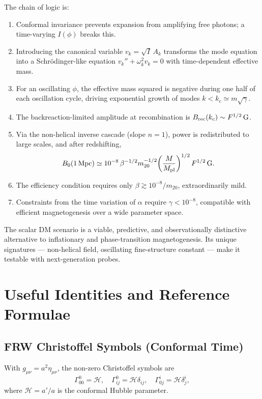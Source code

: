 \documentclass[12pt,a4paper,openany]{book}
\newcommand{\Ak}{A_k}
\newcommand{\vk}{v_k}
\newcommand{\Mpl}{M_{\rm pl}}
\newcommand{\kc}{k_c}
\begin{document}
The chain of logic is:
\begin{enumerate}
  \item Conformal invariance prevents expansion from amplifying free photons; a time-varying $I(\phi)$ breaks this.
  \item Introducing the canonical variable $\vk = \sqrt{I}\,\Ak$ transforms the mode equation into a Schr\"{o}dinger-like equation $\vk'' + \omega_k^2\vk = 0$ with time-dependent effective mass.
  \item For an oscillating $\phi$, the effective mass squared is negative during one half of each oscillation cycle, driving exponential growth of modes $k < \kc \simeq m\sqrt{\gamma}$.
  \item The backreaction-limited amplitude at recombination is $B_{\rm rec}(\kc) \sim F^{1/2}\,\mathrm{G}$.
  \item Via the non-helical inverse cascade (slope $n=1$), power is redistributed to large scales, and after redshifting,
  \[
    B_0(1\,\mathrm{Mpc}) \simeq 10^{-8}\,\beta^{-1/2}m_{20}^{-1/2}\!\left(\frac{M}{\Mpl}\right)^{1/2}F^{1/2}\,\mathrm{G}.
  \]
  \item The efficiency condition requires only $\beta \gtrsim 10^{-8}/m_{20}$, extraordinarily mild.
  \item Constraints from the time variation of $\alpha$ require $\gamma < 10^{-8}$, compatible with efficient magnetogenesis over a wide parameter space.
\end{enumerate}

The scalar DM scenario is a viable, predictive, and observationally distinctive alternative to inflationary and phase-transition magnetogenesis. Its unique signatures — non-helical field, oscillating fine-structure constant — make it testable with next-generation probes.

\appendix
\chapter{Useful Identities and Reference Formulae}

\section{FRW Christoffel Symbols (Conformal Time)}

With $g_{\mu\nu} = a^2\eta_{\mu\nu}$, the non-zero Christoffel symbols are
\begin{equation}
  \Gamma^0_{00} = \mathcal{H}, \quad \Gamma^0_{ij} = \mathcal{H}\delta_{ij}, \quad \Gamma^i_{0j} = \mathcal{H}\delta^i_j,
\end{equation}
where $\mathcal{H} = a'/a$ is the conformal Hubble parameter.
\end{document}
